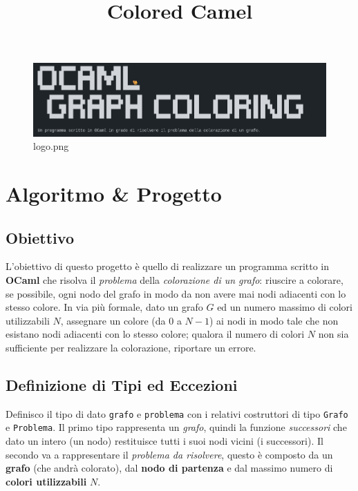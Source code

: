 \documentclass[11pt]{article}
\title{Colored Camel}
\begin{document}
    
    \begin{figure}
\centering
\includegraphics[width=\textwidth, keepaspectratio]{Colored Camel_files/logo.png}
\caption{logo.png}
\end{figure}
\tableofcontents

\newpage
\section{Algoritmo \& Progetto }
    \hypertarget{obiettivo}{%
\subsection{\texorpdfstring{Obiettivo }{Obiettivo }}\label{obiettivo}}

L'obiettivo di questo progetto è quello di realizzare un programma
scritto in \textbf{OCaml} che risolva il \emph{problema} della
\emph{colorazione di un grafo}: riuscire a colorare, se possibile, ogni
nodo del grafo in modo da non avere mai nodi adiacenti con lo stesso
colore. In via più formale, dato un grafo \(G\) ed un numero massimo di
colori utilizzabili \(N\), assegnare un colore (da \(0\) a \(N − 1\)) ai
nodi in modo tale che non esistano nodi adiacenti con lo stesso colore;
qualora il numero di colori \(N\) non sia sufficiente per realizzare la
colorazione, riportare un errore.

    \hypertarget{definizione-di-tipi-ed-eccezioni}{%
\subsection{\texorpdfstring{Definizione di Tipi ed Eccezioni
}{Definizione di Tipi ed Eccezioni }}\label{definizione-di-tipi-ed-eccezioni}}

    Definisco il tipo di dato \texttt{grafo} e \texttt{problema} con i
relativi costruttori di tipo \texttt{Grafo} e \texttt{Problema}. Il
primo tipo rappresenta un \emph{grafo}, quindi la funzione
\emph{successori} che dato un intero (un nodo) restituisce tutti i suoi
nodi vicini (i successori). Il secondo va a rappresentare il
\emph{problema da risolvere}, questo è composto da un \textbf{grafo}
(che andrà colorato), dal \textbf{nodo di partenza} e dal massimo numero
di \textbf{colori utilizzabili} \(N\).
\end{document}
